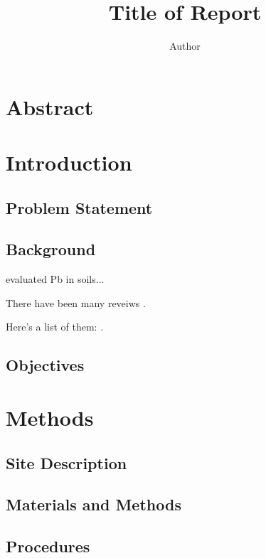 \documentclass{article}\usepackage[]{graphicx}\usepackage[]{color}
\author{Author}
\title{Title of Report}
\begin{document}
\maketitle

\section{Abstract}



\section{Introduction}

\subsection{Problem Statement}

\subsection{Background}

\cite{lanphear1998contribution} evaluated Pb in soils...

There have been many reveiws \citep{tidball1976lead}.

Here's a list of them: \cite{zimdahl1977behavior, barltrop1975absorption, wang2006transfer}.

\subsection{Objectives}



\section{Methods}

\subsection{Site Description}

\subsection{Materials and Methods}

\subsection{Procedures}
\end{document}
